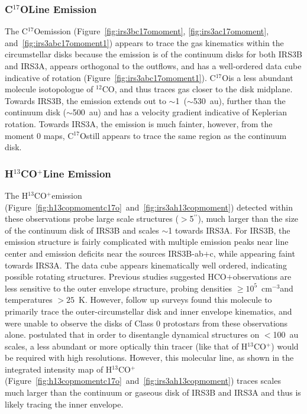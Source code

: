 \documentclass[twocolumn, 12pt]{aastex63}
\newcommand{\cso}{C$^{17}$O}
\newcommand{\htcop}{H$^{13}$CO$^+$}
\newcommand{\co}{$^{12}$CO}
\renewcommand{\arcsec}{$^{\prime\prime}$}
\newcommand{\ab}{$\sim$}
\begin{document}
\subsubsection{\cso\space Line Emission}\label{sec:csoemission}
The \cso\space emission (Figure~\ref{fig:irs3bc17omoment}, \ref{fig:irs3ac17omoment}, and~\ref{fig:irs3abc17omoment1}) appears to trace the gas kinematics within the circumstellar disks because the emission is  of the continuum disks for both IRS3B and IRS3A, appears orthogonal to the outflows, and has a well-ordered data cube indicative of rotation (Figure~\ref{fig:irs3abc17omoment1}). \cso\space is a less abundant molecule \citep[ISM $\lbrack$\co$\rbrack/\lbrack$\cso$\rbrack\approx$1700:1; e.g.][]{1994ARAA..32..191W} isotopologue of \co\space\citep[ISM $\lbrack H_{2}\rbrack/\lbrack$\co$\rbrack\approx$10$^{4}$:1; e.g.][]{2009AA...503..323V}, and thus traces gas closer to the disk midplane. Towards IRS3B, the emission extends out to \ab1~(\ab530~au), further than the continuum disk (\ab500~au) and has a velocity gradient indicative of Keplerian rotation. Towards IRS3A, the emission is much fainter, however, from the moment 0 maps, \cso\space still appears to trace the same region as the continuum disk.

\subsubsection{\htcop\space Line Emission}\label{sec:htcopemission}
The \htcop\space emission (Figure~\ref{fig:h13copmomentc17o}~and~\ref{fig:irs3ah13copmoment}) detected within these observations probe large scale structures ($>$5\arcsec), much larger than the size of the continuum disk of IRS3B and scales \ab1 towards IRS3A. For IRS3B, the emission structure is fairly complicated with multiple emission peaks near line center and emission deficits near the sources IRS3B-ab$+$c, while appearing faint towards IRS3A. The data cube appears kinematically well ordered, indicating possible rotating structures. Previous studies suggested HCO$+$\space observations are less sensitive to the outer envelope structure, probing densities $\ge10^{5}$~cm$^{-3}$\space and temperatures $>25$~K\space \citep{1999ARAA..37..311E}. However, follow up surveys \citep{2009AA...507..861J} found this molecule to primarily trace the outer-circumstellar disk and inner envelope kinematics, and were unable to observe the disks of Class 0 protostars from these observations alone. \citet{2009AA...507..861J}\space postulated that in order to disentangle dynamical structures on $<$100~au scales, a less abundant or more optically thin tracer (like that of \htcop) would be required with high resolutions. However, this molecular line, as shown in the integrated intensity map of \htcop\space (Figure~\ref{fig:h13copmomentc17o}~and~\ref{fig:irs3ah13copmoment}) traces scales much larger than the continuum or gaseous disk of IRS3B and IRS3A and thus is likely tracing the inner envelope.
\end{document}
